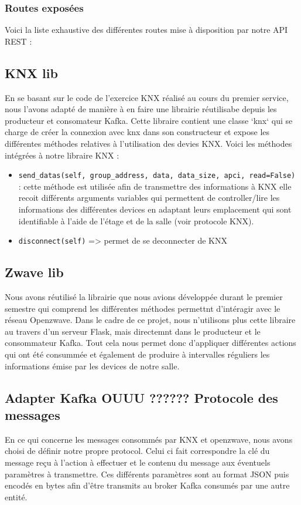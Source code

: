 \subsubsection{Routes exposées}
Voici la liste exhaustive des différentes routes mise à disposition par notre API REST : 


\subsection{KNX lib}
En se basant sur le code de l'exercice KNX réalisé au cours du premier service, nous l'avons adapté de manière à en faire une librairie réutilisabe depuis les producteur et consomateur Kafka.
Cette libraire contient une classe `knx` qui se charge de créer la connexion avec knx dans son constructeur et expose les différentes méthodes relatives à l'utilisation des devies KNX.
Voici les méthodes intégrées à notre libraire KNX :
\begin{itemize}
    \item \texttt{send_datas(self, group_address, data, data_size, apci, read=False)} : cette méthode est utilisée afin de transmettre des informations à KNX elle recoit différents arguments variables qui permettent de controller/lire les informations des différentes devices en adaptant leurs emplacement qui sont identifiable à l'aide de l'étage et de la salle (voir protocole KNX).
    \item \texttt{disconnect(self)} => permet de se deconnecter de KNX
\end{itemize}

\subsection{Zwave lib}
Nous avons réutilisé la librairie que nous avions développée durant le premier semestre qui comprend les différentes méthodes permettnt d'intéragir avec le réseau Openzwave. 
Dans le cadre de ce projet, nous n'utilisons plus cette libraire au travers d'un serveur Flask, mais directemnt dans le producteur et le consommateur Kafka.
Tout cela nous permet donc d'appliquer différentes actions qui ont été consummée et également de produire à intervalles réguliers les informations émise par les devices de notre salle.

\subsection{Adapter Kafka OUUU ?????? Protocole des messages}
En ce qui concerne les messages consommés par KNX et openzwave, nous avons choisi de définir notre propre protocol.
Celui ci fait correspondre la clé du message reçu à l'action à effectuer et le contenu du message aux éventuels paramètres à transmettre. Ces différents paramètres sont au format JSON puis encodés en bytes afin d'être transmits au broker Kafka consumés par une autre entité.

